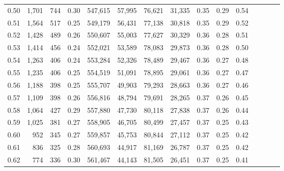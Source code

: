 \begin{tabular}{rrrcrrrrrrrrrrr}
0.50 &   1,701 &    744 &                                       0.30 &  547,615 &   57,995 &   76,621 &   31,335 &  0.35 &  0.29 &                         0.54 \\
0.51 &   1,564 &    517 &                                       0.25 &  549,179 &   56,431 &   77,138 &   30,818 &  0.35 &  0.29 &                         0.52 \\
0.52 &   1,428 &    489 &                                       0.26 &  550,607 &   55,003 &   77,627 &   30,329 &  0.36 &  0.28 &                         0.51 \\
0.53 &   1,414 &    456 &                                       0.24 &  552,021 &   53,589 &   78,083 &   29,873 &  0.36 &  0.28 &                         0.50 \\
0.54 &   1,263 &    406 &                                       0.24 &  553,284 &   52,326 &   78,489 &   29,467 &  0.36 &  0.27 &                         0.48 \\
0.55 &   1,235 &    406 &                                       0.25 &  554,519 &   51,091 &   78,895 &   29,061 &  0.36 &  0.27 &                         0.47 \\
0.56 &   1,188 &    398 &                                       0.25 &  555,707 &   49,903 &   79,293 &   28,663 &  0.36 &  0.27 &                         0.46 \\
0.57 &   1,109 &    398 &                                       0.26 &  556,816 &   48,794 &   79,691 &   28,265 &  0.37 &  0.26 &                         0.45 \\
0.58 &   1,064 &    427 &                                       0.29 &  557,880 &   47,730 &   80,118 &   27,838 &  0.37 &  0.26 &                         0.44 \\
0.59 &   1,025 &    381 &                                       0.27 &  558,905 &   46,705 &   80,499 &   27,457 &  0.37 &  0.25 &                         0.43 \\
0.60 &     952 &    345 &                                       0.27 &  559,857 &   45,753 &   80,844 &   27,112 &  0.37 &  0.25 &                         0.42 \\
0.61 &     836 &    325 &                                       0.28 &  560,693 &   44,917 &   81,169 &   26,787 &  0.37 &  0.25 &                         0.42 \\
0.62 &     774 &    336 &                                       0.30 &  561,467 &   44,143 &   81,505 &   26,451 &  0.37 &  0.25 &                         0.41 \\

\end{tabular}
